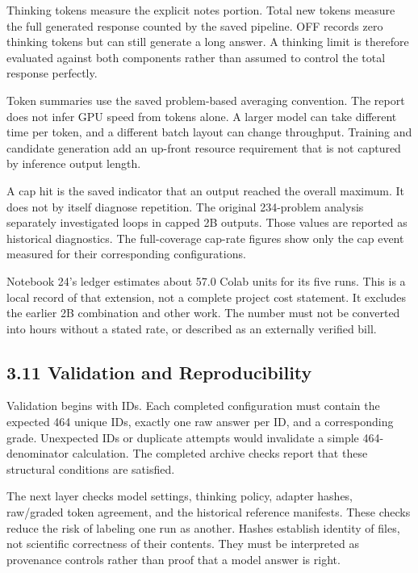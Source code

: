 \documentclass[11pt,letterpaper]{article}
\begin{document}
Thinking tokens measure the explicit notes portion. Total new tokens measure the full generated response counted by the saved pipeline. OFF records zero thinking tokens but can still generate a long answer. A thinking limit is therefore evaluated against both components rather than assumed to control the total response perfectly.\par

Token summaries use the saved problem-based averaging convention. The report does not infer GPU speed from tokens alone. A larger model can take different time per token, and a different batch layout can change throughput. Training and candidate generation add an up-front resource requirement that is not captured by inference output length.\par

A cap hit is the saved indicator that an output reached the overall maximum. It does not by itself diagnose repetition. The original 234-problem analysis separately investigated loops in capped 2B outputs. Those values are reported as historical diagnostics. The full-coverage cap-rate figures show only the cap event measured for their corresponding configurations.\par

Notebook 24's ledger estimates about 57.0 Colab units for its five runs. This is a local record of that extension, not a complete project cost statement. It excludes the earlier 2B combination and other work. The number must not be converted into hours without a stated rate, or described as an externally verified bill.\par

\subsection*{3.11 Validation and Reproducibility}

Validation begins with IDs. Each completed configuration must contain the expected 464 unique IDs, exactly one raw answer per ID, and a corresponding grade. Unexpected IDs or duplicate attempts would invalidate a simple 464-denominator calculation. The completed archive checks report that these structural conditions are satisfied.\par

The next layer checks model settings, thinking policy, adapter hashes, raw/graded token agreement, and the historical reference manifests. These checks reduce the risk of labeling one run as another. Hashes establish identity of files, not scientific correctness of their contents. They must be interpreted as provenance controls rather than proof that a model answer is right.\par
\end{document}
